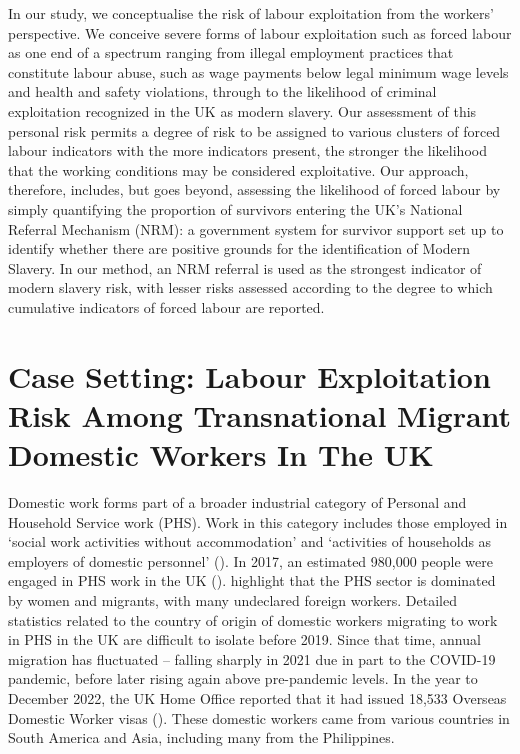 \documentclass[
  12pt,
  letterpaper,
  DIV=11,
  numbers=noendperiod]{scrartcl}
\theoremstyle{plain}
\theoremstyle{definition}
\begin{document}
In our study, we conceptualise the risk of labour exploitation from the
workers' perspective. We conceive severe forms of labour exploitation
such as forced labour as one end of a spectrum ranging from illegal
employment practices that constitute labour abuse, such as wage payments
below legal minimum wage levels and health and safety violations,
through to the likelihood of criminal exploitation recognized in the UK
as modern slavery. Our assessment of this personal risk permits a degree
of risk to be assigned to various clusters of forced labour indicators
with the more indicators present, the stronger the likelihood that the
working conditions may be considered exploitative. Our approach,
therefore, includes, but goes beyond, assessing the likelihood of forced
labour by simply quantifying the proportion of survivors entering the
UK's National Referral Mechanism (NRM): a government system for survivor
support set up to identify whether there are positive grounds for the
identification of Modern Slavery. In our method, an NRM referral is used
as the strongest indicator of modern slavery risk, with lesser risks
assessed according to the degree to which cumulative indicators of
forced labour are reported.

\section{Case Setting: Labour Exploitation Risk Among Transnational
Migrant Domestic Workers In The
UK}\label{case-setting-labour-exploitation-risk-among-transnational-migrant-domestic-workers-in-the-uk}

Domestic work forms part of a broader industrial category of Personal
and Household Service work (PHS). Work in this category includes those
employed in `social work activities without accommodation' and
`activities of households as employers of domestic personnel'
(\textcite{european_commission_staff_2012}). In 2017, an estimated
980,000 people were engaged in PHS work in the UK
(\textcite{manoudi_analysis_2018}). \textcite{manoudi_analysis_2018}
highlight that the PHS sector is dominated by women and migrants, with
many undeclared foreign workers. Detailed statistics related to the
country of origin of domestic workers migrating to work in PHS in the UK
are difficult to isolate before 2019. Since that time, annual migration
has fluctuated -- falling sharply in 2021 due in part to the COVID-19
pandemic, before later rising again above pre-pandemic levels. In the
year to December 2022, the UK Home Office reported that it had issued
18,533 Overseas Domestic Worker visas (\textcite{home_office_why_2023}).
These domestic workers came from various countries in South America and
Asia, including many from the Philippines.
\end{document}
